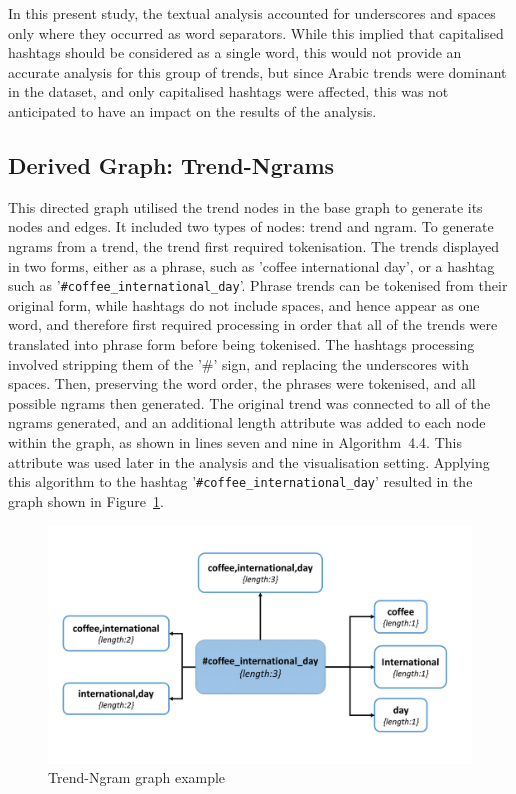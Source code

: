 \documentclass[conference]{IEEEtran}
\begin{document}
In this present study, the textual analysis accounted for underscores
and spaces only where they occurred as word separators. While this
implied that capitalised hashtags should be considered as a single
word, this would not provide an accurate analysis for this group of
trends, but since Arabic trends were dominant in the dataset, and only
capitalised hashtags were affected, this was not anticipated to have
an impact on the results of the analysis.


\subsection{Derived Graph: Trend-Ngrams}

This directed graph utilised the trend nodes in the base graph to
generate its nodes and edges. It included two types of nodes: trend
and ngram. To generate ngrams from a trend, the trend first required
tokenisation. The trends displayed in two forms, either as a phrase,
such as 'coffee international day', or a hashtag such as
'{\texttt{\#coffee\_international\_day}}'.  Phrase trends can be
tokenised from their original form, while hashtags do not include
spaces, and hence appear as one word, and therefore first required
processing in order that all of the trends were translated into phrase
form before being tokenised. The hashtags processing involved
stripping them of the '\#' sign, and replacing the underscores with
spaces. Then, preserving the word order, the phrases were tokenised,
and all possible ngrams then generated.  The original trend was
connected to all of the ngrams generated, and an additional length
attribute was added to each node within the graph, as shown in lines
seven and nine in Algorithm~4.4.  This attribute was used later in the
analysis and the visualisation setting. Applying this algorithm to the
hashtag '{\texttt{\#coffee\_international\_day}}' resulted in the
graph shown in Figure~\ref{fig:tngraph}.

\begin{figure}[htb] \centering
\includegraphics[width=\columnwidth]{images/trend_ngram_example.png}
\caption{Trend-Ngram graph example}
\label{fig:tngraph}
\end{figure}
\end{document}
